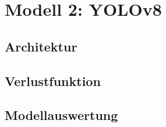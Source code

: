 \chapter{Modell 2: YOLOv8}\label{chap:yolov8}
\section{Architektur}



\section{Verlustfunktion}



\section{Modellauswertung}